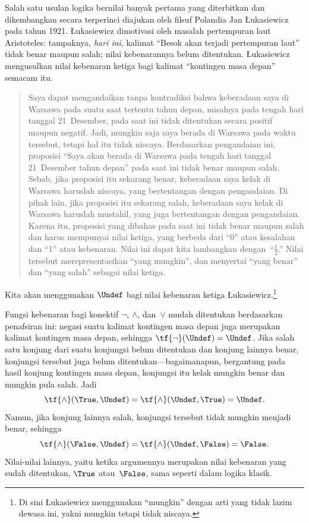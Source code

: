 \documentclass[../../../include/open-logic-section]{subfiles}
\begin{document}


Salah satu usulan logika bernilai banyak pertama yang diterbitkan dan
dikembangkan secara terperinci diajukan oleh filsuf Polandia Jan
\L ukasiewicz pada tahun 1921. \L ukasiewicz dimotivasi oleh masalah
pertempuran laut Aristoteles: tampaknya, \emph{hari ini}, kalimat
``Besok akan terjadi pertempuran laut'' tidak benar maupun salah; nilai
kebenarannya belum ditentukan. \L ukasiewicz mengusulkan nilai kebenaran
ketiga bagi kalimat ``kontingen masa depan'' semacam itu.
\begin{quote}
Saya dapat mengandaikan tanpa kontradiksi bahwa keberadaan saya di Warsawa
pada suatu saat tertentu tahun depan, misalnya pada tengah hari tanggal
21~Desember, pada saat ini tidak ditentukan secara positif maupun negatif.
Jadi, mungkin saja saya berada di Warsawa pada waktu tersebut, tetapi hal itu
tidak niscaya. Berdasarkan pengandaian ini, proposisi ``Saya akan berada di
Warsawa pada tengah hari tanggal 21~Desember tahun depan'' pada saat ini tidak
benar maupun salah. Sebab, jika proposisi itu sekarang benar, keberadaan saya
kelak di Warsawa haruslah niscaya, yang bertentangan dengan pengandaian. Di
pihak lain, jika proposisi itu sekarang salah, keberadaan saya kelak di
Warsawa haruslah mustahil, yang juga bertentangan dengan pengandaian. Karena
itu, proposisi yang dibahas pada saat ini tidak benar maupun salah dan harus
mempunyai nilai ketiga, yang berbeda dari ``0'' atau kesalahan dan ``1'' atau
kebenaran. Nilai ini dapat kita lambangkan dengan~``$\frac{1}{2}$.'' Nilai
tersebut merepresentasikan ``yang mungkin'', dan menyertai ``yang benar'' dan
``yang salah'' sebagai nilai ketiga.
\end{quote}
Kita akan menggunakan $\Undef$ bagi nilai kebenaran ketiga
\L ukasiewicz.\footnote{Di sini \L ukasiewicz menggunakan ``mungkin'' dengan
arti yang tidak lazim dewasa ini, yakni mungkin tetapi tidak niscaya.}

Fungsi kebenaran bagi konektif $\lnot$, $\land$, dan~$\lor$ mudah ditentukan
berdasarkan penafsiran ini: negasi suatu kalimat kontingen masa depan juga
merupakan kalimat kontingen masa depan, sehingga
$\tf{\lnot}(\Undef)=\Undef$. Jika salah satu konjung dari suatu konjungsi
belum ditentukan dan konjung lainnya benar, konjungsi tersebut juga belum
ditentukan---bagaimanapun, bergantung pada hasil konjung kontingen masa depan,
konjungsi itu kelak mungkin benar dan mungkin pula salah. Jadi
\[
    \tf{\land}(\True,\Undef)=
\tf{\land}(\Undef,\True)=
\Undef.
\]
Namun, jika konjung lainnya salah, konjungsi tersebut tidak mungkin menjadi
benar, sehingga
\[\tf{\land}(\False,\Undef)=
\tf{\land}(\Undef,\False)=\False.\]
Nilai-nilai lainnya, yaitu ketika argumennya merupakan nilai kebenaran yang
sudah ditentukan, $\True$ atau~$\False$, sama seperti dalam logika klasik.
\end{document}
